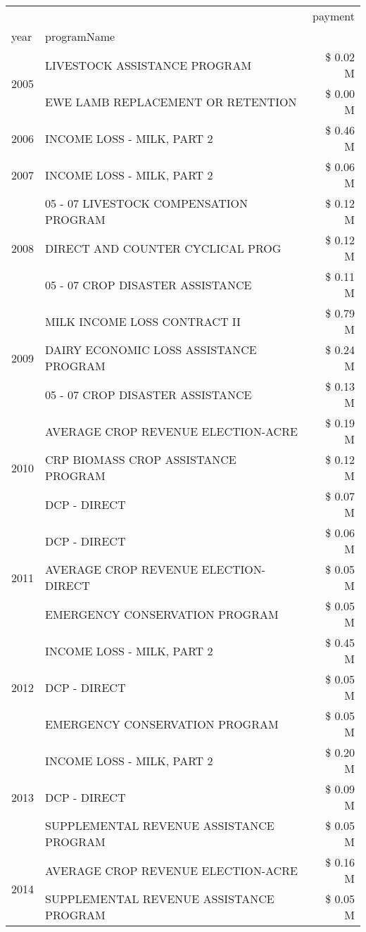 \begin{tabular}{llr}
\toprule
 &  & payment \\
year & programName &  \\
\midrule
\multirow[t]{2}{*}{2005} & LIVESTOCK ASSISTANCE PROGRAM & \$ 0.02 M \\
 & EWE LAMB REPLACEMENT OR RETENTION & \$ 0.00 M \\
\cline{1-3}
2006 & INCOME LOSS - MILK, PART 2 & \$ 0.46 M \\
\cline{1-3}
2007 & INCOME LOSS - MILK, PART 2 & \$ 0.06 M \\
\cline{1-3}
\multirow[t]{3}{*}{2008} & 05 - 07 LIVESTOCK COMPENSATION PROGRAM & \$ 0.12 M \\
 & DIRECT AND COUNTER CYCLICAL PROG & \$ 0.12 M \\
 & 05 - 07 CROP DISASTER ASSISTANCE & \$ 0.11 M \\
\cline{1-3}
\multirow[t]{3}{*}{2009} & MILK INCOME LOSS CONTRACT II & \$ 0.79 M \\
 & DAIRY ECONOMIC LOSS ASSISTANCE PROGRAM & \$ 0.24 M \\
 & 05 - 07 CROP DISASTER ASSISTANCE & \$ 0.13 M \\
\cline{1-3}
\multirow[t]{3}{*}{2010} & AVERAGE CROP REVENUE ELECTION-ACRE & \$ 0.19 M \\
 & CRP BIOMASS CROP ASSISTANCE PROGRAM & \$ 0.12 M \\
 & DCP - DIRECT & \$ 0.07 M \\
\cline{1-3}
\multirow[t]{3}{*}{2011} & DCP - DIRECT & \$ 0.06 M \\
 & AVERAGE CROP REVENUE ELECTION-DIRECT & \$ 0.05 M \\
 & EMERGENCY CONSERVATION PROGRAM & \$ 0.05 M \\
\cline{1-3}
\multirow[t]{3}{*}{2012} & INCOME LOSS - MILK, PART 2 & \$ 0.45 M \\
 & DCP - DIRECT & \$ 0.05 M \\
 & EMERGENCY CONSERVATION PROGRAM & \$ 0.05 M \\
\cline{1-3}
\multirow[t]{3}{*}{2013} & INCOME LOSS - MILK, PART 2 & \$ 0.20 M \\
 & DCP - DIRECT & \$ 0.09 M \\
 & SUPPLEMENTAL REVENUE ASSISTANCE PROGRAM & \$ 0.05 M \\
\cline{1-3}
\multirow[t]{3}{*}{2014} & AVERAGE CROP REVENUE ELECTION-ACRE & \$ 0.16 M \\
 & SUPPLEMENTAL REVENUE ASSISTANCE PROGRAM & \$ 0.05 M \\

\end{tabular}
